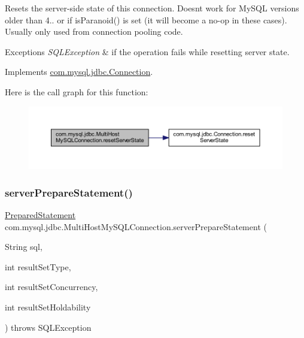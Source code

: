 Resets the server-\/side state of this connection. Doesn\textquotesingle{}t work for My\+S\+QL versions older than 4.. or if is\+Paranoid() is set (it will become a no-\/op in these cases). Usually only used from connection pooling code.


\begin{DoxyExceptions}{Exceptions}
{\em S\+Q\+L\+Exception} & if the operation fails while resetting server state. \\
\hline
\end{DoxyExceptions}


Implements \mbox{\hyperlink{interfacecom_1_1mysql_1_1jdbc_1_1_connection_ac618ee80c02d7672e277b3be75304f6e}{com.\+mysql.\+jdbc.\+Connection}}.

Here is the call graph for this function\+:
\nopagebreak
\begin{figure}[H]
\begin{center}
\leavevmode
\includegraphics[width=350pt]{classcom_1_1mysql_1_1jdbc_1_1_multi_host_my_s_q_l_connection_a5099a4923c0bc5e2bfb8236dfe88453c_cgraph}
\end{center}
\end{figure}
\mbox{\label{classcom_1_1mysql_1_1jdbc_1_1_multi_host_my_s_q_l_connection_ac7585cb7791fb3f439f1dec002b9486e}} 
\subsubsection{\texorpdfstring{server\+Prepare\+Statement()}{serverPrepareStatement()}\hspace{0.1cm}{\footnotesize\ttfamily [1/6]}}
{\footnotesize\ttfamily \mbox{\hyperlink{classcom_1_1mysql_1_1jdbc_1_1_prepared_statement}{Prepared\+Statement}} com.\+mysql.\+jdbc.\+Multi\+Host\+My\+S\+Q\+L\+Connection.\+server\+Prepare\+Statement (\begin{DoxyParamCaption}\item[{String}]{sql,  }\item[{int}]{result\+Set\+Type,  }\item[{int}]{result\+Set\+Concurrency,  }\item[{int}]{result\+Set\+Holdability }\end{DoxyParamCaption}) throws S\+Q\+L\+Exception}


